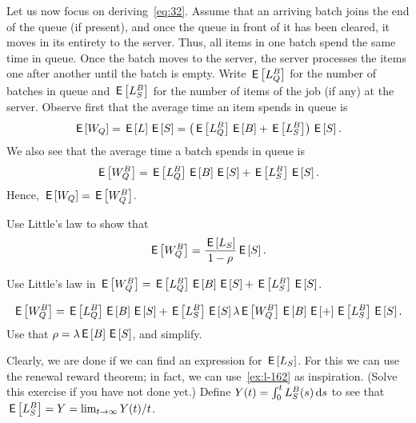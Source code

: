 Let us now focus on deriving~\cref{eq:32}.
Assume that an arriving batch joins the end of the queue (if present), and once the queue in front of it has been cleared, it moves in its entirety to the server.
Thus, all items in one batch spend the same time in queue.
Once the batch moves to the server, the server processes the items one after another until the batch is empty.
Write $\E{L_Q^B}$ for the number of batches in queue and $\E{L_S^B}$ for the number of items of the job (if any) at the server.  Observe first that the average time an item spends in queue is
\begin{align*}
  \E{W_Q} = \E L \E S = \left(\E{L_Q^B} \E B + \E{L_S^B}\right)\E S.
\end{align*}
We also see that the average time a batch spends in queue is 
\begin{align*}
  \E{W_Q^B} = \E{L_Q^B} \E B \E S + \E{L_S^B}\E S.
\end{align*}
Hence, $\E{W_Q} = \E{W_Q^B}$. 

\begin{exercise}
Use Little's law to show that
 \begin{equation*}
 \E{W^B_{Q}} = \frac{\E{L_S}}{1-\rho}\E{S}.
 \end{equation*}
    \begin{hint}
  Use Little's law in $\E{W_Q^B} = \E{L_Q^B} \E B \E S + \E{L_S^B}\E S$. 
\end{hint}
\begin{solution}
  \begin{align*}
  \E{W_Q^B} = \E{L_Q^B} \E B \E S + \E{L_S^B}\E S 
  \lambda \E{W_Q^B}  \E B \E + \E{L_S^B}\E S. 
  \end{align*}
Use that $\rho = \lambda \E B \E S$, and simplify.
\end{solution}
\end{exercise}

Clearly, we are done if we can find an expression for $\E{L_S}$.
For this we can use the renewal reward theorem; in fact, we can use~\cref{ex:l-162} as inspiration.
(Solve this exercise if you have not done yet.) Define $Y(t) = \int_0^t L_S^B(s) \d s$ to  see that $\E{L_S^B} = Y = \lim_{t\to\infty} Y(t)/t$. 

